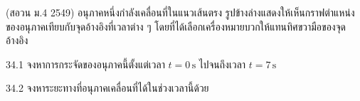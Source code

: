 (สอวน ม.4 2549) อนุภาคหนึ่งกำลังเคลื่อนที่ในแนวเส้นตรง รูปข้างล่างแสดงให้เห็นกราฟตำแหน่งของอนุภาคเทียบกับจุดอ้างอิงที่เวลาต่าง ๆ โดยที่ได้เลือกเครื่องหมายบวกให้แทนทิศขวามือของจุดอ้างอิง

34.1 จงหาการกระจัดของอนุภาคนี้ตั้งแต่เวลา $t=0\,\mathrm{s}$ ไปจนถึงเวลา $t=7\,\mathrm{s}$

34.2 จงหาระยะทางที่อนุภาคเคลื่อนที่ได้ในช่วงเวลานี้ด้วย
\begin{center}\end{center}
